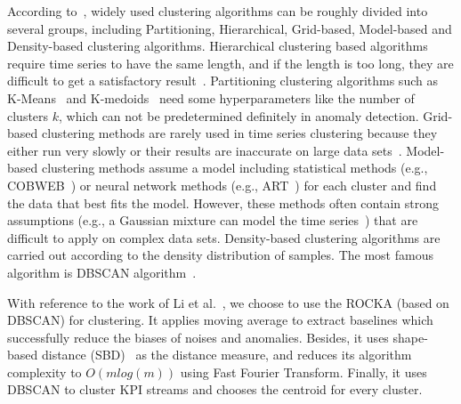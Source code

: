 According to~\cite{AGHABOZORGI201516}, widely used clustering algorithms can be roughly divided into several groups, including Partitioning, Hierarchical, Grid-based, Model-based and Density-based clustering algorithms. Hierarchical clustering based algorithms require time series to have the same length, and if the length is too long, they are difficult to get a satisfactory result~\cite{CharacteristicBased}. Partitioning clustering algorithms such as K-Means~\cite{MacQueen1967SomeMF} and K-medoids~\cite{kaufman2009finding} need some hyperparameters like the number of clusters $k$, which can not be predetermined definitely in anomaly detection. Grid-based clustering methods are rarely used in time series clustering because they either run very slowly or their results are inaccurate on large data sets~\cite{AGHABOZORGI201516}. Model-based clustering methods assume a model including statistical methods (e.g., COBWEB~\cite{KnowledgeAcquisition}) or neural network methods (e.g., ART~\cite{CARPENTER198754}) for each cluster and find the data that best fits the model. However, these methods often contain strong assumptions (e.g., a Gaussian mixture can model the time series~\cite{865189}) that are difficult to apply on complex data sets. Density-based clustering algorithms are carried out according to the density distribution of samples. The most famous algorithm is DBSCAN algorithm~\cite{ester1996density}.

With reference to the work of Li et al.~\cite{lirobust}, we choose to use the ROCKA (based on DBSCAN) for clustering. It applies moving average to extract baselines which successfully reduce the biases of noises and anomalies. Besides, it uses shape-based distance (SBD)~\cite{paparrizos2015k} as the distance measure, and reduces its algorithm complexity to $O(m log(m))$ using Fast Fourier Transform. Finally, it uses DBSCAN to cluster KPI streams and chooses the centroid for every cluster. 




